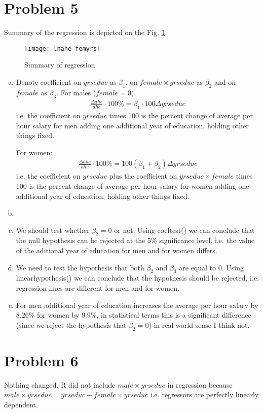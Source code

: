\documentclass[a4paper]{article}
\begin{document}
\section*{Problem 5}
Summary of the regression is depicted on the Fig. \ref{fig1}.

\begin{figure}[H]
	\centering
	\texttt{[image: lnahe\_femyrs]}
	\caption{Summary of regression}\label{fig1}
\end{figure}

\begin{enumerate}[a.]
	\item Denote coefficient on $yrseduc$ as $\beta_1$, on $female\times yrseduc$ as $\beta_2$ and on $female$ as $\beta_3$. For males ($female = 0$)
	\begin{align*}
	\frac{\Delta ahe}{ahe} \cdot 100\% = \beta_1 \cdot 100 \Delta yrseduc
	\end{align*}
	i.e. the coefficient on $yrseduc$ times 100 is the percent change of average per hour salary for men adding one additional year of education, holding other things fixed.
	
	For women:
	\begin{align*}
	\frac{\Delta ahe}{ahe} \cdot 100\% = 100(\beta_1 + \beta_2)\Delta yrseduc
	\end{align*}
	i.e. the coefficient on $yrseduc$ plus the coefficient on $yrseduc \times female$ times 100 is the percent change of average per hour salary for women adding one additional year of education, holding other things fixed.
	\item 
	\item We should test whether $\beta_2 = 0$ or not. Using coeftest() we can conclude that the null hypothesis can be rejected at the 5\% significance level, i.e. the value of the aditional year of education for men and for women differs.
	\item We need to test the hypothesis that both $\beta_2$ and $\beta_3$ are equal to 0. Using linearhypothesis() we can conclude that the hypothesis should be rejected, i.e. regression lines are different for men and for women.
	\item For men additional year of education increases the average per hour salary by $8.26\%$ for women by $9.9\%$, in statistical terms this is a significant difference (since we reject the hypothesis that $\beta_2 = 0$) in real world sense I think not.
\end{enumerate}
\section*{Problem 6}
Nothing changed. R did not include $male \times yrseduc$ in regression because $male \times yrseduc = yrseduc - female \times yrseduc$ i.e. regressors are perfectly linearly dependent.
\end{document}

